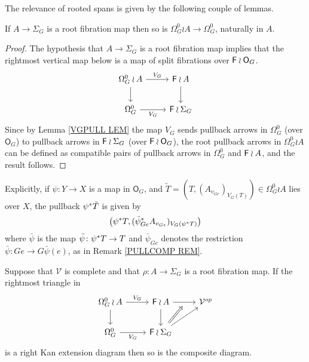 \documentclass[a4paper,10pt]{article}%
\begin{document}
The relevance of rooted spans is given by the following couple of lemmas.

\begin{lemma}\label{ROOTFIBPULL LEM}
If $A \to \Sigma_G$ is a root fibration map then so is 
$\Omega_G^0 \wr A \to \Omega_G^0$, naturally in $A$.
\end{lemma}

\begin{proof}
The hypothesis that $A \to \Sigma_G$ is a root fibration map
implies that the rightmost vertical map below 
is a map of split fibrations over
$\mathsf{F} \wr \mathsf{O}_G$.
\[
\begin{tikzcd}
	\Omega_{G}^0 \wr A \ar{r}{V_G} \ar{d} &
	\Fin \wr A \ar{d}
\\
	\Omega_{G}^0 \ar{r}[swap]{V_G} &
	\Fin \wr \Sigma_G
\end{tikzcd}
\]
Since by Lemma \ref{VGPULL LEM} the map $V_G$ sends pullback  arrows in $\Omega_{G}^0$
(over $\mathsf{O}_G$) to pullback arrows in $\mathsf{F} \wr \Sigma_G$ (over $\mathsf{F} \wr \mathsf{O}_G$), 
the root pullback arrows in 
$\Omega_G^0 \wr A$ can be defined as compatible pairs of pullback arrows in $\Omega^0_G$ and $\mathsf{F} \wr A$,
and the result follows.
\end{proof}


\begin{remark}
Explicitly, if $\psi \colon Y \to X$ is a map in $\mathsf{O}_G$,
and $\tilde{T} =(T,(A_{v_{Ge}})_{V_G(T)}) \in \Omega_G^0 \wr A$ lies over $X$,
the pullback $\psi^{\**} \tilde{T}$ is given by
\[
\left(\psi^{\**}T,(\bar{\psi}^{\**}_{Ge}
 A_{v_{Ge}})_{V_G(\psi^{\**}T)}\right)
\]
where $\bar{\psi}$ is the map 
$\bar{\psi} \colon \psi^{\**}T \to T$
and $\bar{\psi}_{G e}$ denotes the restriction
$\bar{\psi} \colon G e \to G \bar{\psi}(e)$, 
as in Remark \ref{PULLCOMP REM}.
\end{remark}


\begin{lemma}\label{LANPULLCOMA LEM}
	Suppose that $\mathcal{V}$ is complete and that $\rho \colon A \to \Sigma_G$ is a root fibration map. If the rightmost triangle in 
\[
\begin{tikzcd}
	\Omega_{G}^{0} \wr A \ar{r}{V_G} 
	\ar{d} & 
	\Fin \wr A  
	\ar{d}  \ar{r}[swap,name=F]{}&
	\mathcal{V}^{op}
\\
	\Omega_{G}^{0} \ar{r}[swap]{V_G} & 
	|[alias=FEG]|\Fin \wr \Sigma_G \ar{ru}
\arrow[Rightarrow, from=FEG, to=F,shorten <=0.15cm]
\end{tikzcd}
\]
is a right Kan extension diagram then so is the composite diagram.
\end{lemma}
\end{document}
